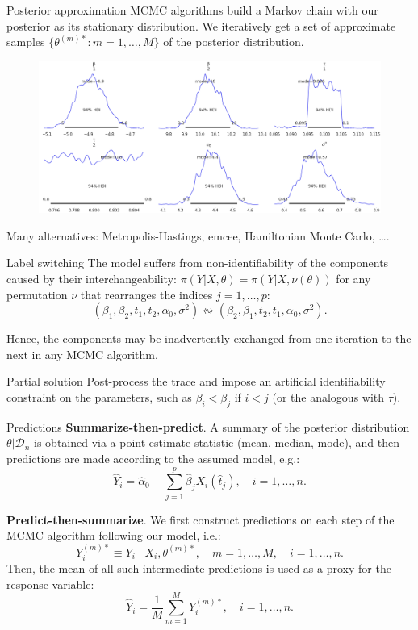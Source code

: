 \documentclass[9pt, english, professionalfonts]{beamer}
\newcommand\maroon[1]{\color{mLightBrown}#1\color{mDarkTeal}}
\newcommand{\D} {\ensuremath{\mathcal{D}}}
\begin{document}
\begin{frame}{Posterior approximation}
 MCMC algorithms build a Markov chain with our posterior as its stationary distribution. We iteratively get a set of approximate samples \(\{\theta^{(m)*}: m=1,\dots, M\}\) of the posterior distribution.

  \begin{figure}
    \centering
    \includegraphics[width=.9\textwidth]{posterior}
  \end{figure}

Many alternatives: Metropolis-Hastings, \maroon{emcee}, Hamiltonian Monte Carlo, \ldots.
\end{frame}

\begin{frame}{Label switching}
The model suffers from non-identifiability of the components caused by their interchangeability: \(\pi(Y|X,\theta)=\pi(Y|X, \nu(\theta))\) for any permutation \(\nu\) that rearranges the indices \(j=1,\dots, p\):
    \[
    (\beta_1, \beta_2, t_1, t_2, \alpha_0, \sigma^2) \leftrightsquigarrow (\beta_2, \beta_1, t_2, t_1, \alpha_0, \sigma^2).
  \]

Hence, the components may be inadvertently exchanged from one iteration to the next in any MCMC algorithm.

\vspace{1em}
\begin{alertblock}{Partial solution}
  \vspace{0.25em}
  Post-process the trace and impose an artificial identifiability constraint on the parameters, such as \(\beta_i < \beta_j\) if \(i<j\) (or the analogous with \(\tau\)).
\end{alertblock}
\end{frame}

\begin{frame}{Predictions}
  \textbf{Summarize-then-predict}. A summary of the posterior distribution \(\theta| \D_n\) is obtained via a point-estimate statistic (mean, median, mode), and then predictions are made according to the assumed model, e.g.:
  \[
  \hat Y_i =\hat \alpha_0 + \sum_{j=1}^p \hat \beta_j X_i(\hat t_j), \quad i=1,\dots, n.
  \]

  \textbf{Predict-then-summarize}. We first construct predictions on each step of the MCMC algorithm following our model, i.e.:
  \[
    Y_i^{(m)*} \equiv Y_i \mid X_i, \theta^{(m)*}, \quad m=1,\dots,M, \quad i=1,\dots, n.
  \]
  Then, the mean of all such intermediate predictions is used as a proxy for the response variable:
  \[
    \hat Y_i = \frac{1}{M}\sum_{m=1}^M Y_i^{(m)*}, \quad i=1,\dots, n.
  \]
\end{frame}
\end{document}

